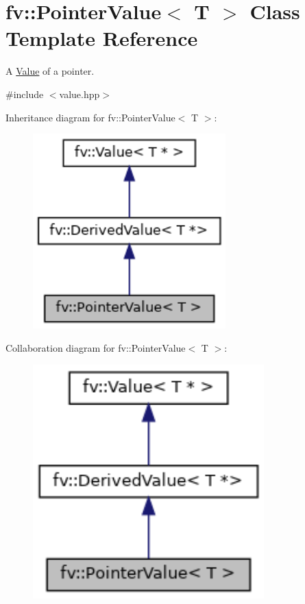 \hypertarget{classfv_1_1PointerValue}{}\section{fv\+:\+:Pointer\+Value$<$ T $>$ Class Template Reference}
\label{classfv_1_1PointerValue}


A \hyperlink{classfv_1_1Value}{Value} of a pointer.  




{\ttfamily \#include $<$value.\+hpp$>$}



Inheritance diagram for fv\+:\+:Pointer\+Value$<$ T $>$\+:
\nopagebreak
\begin{figure}[H]
\begin{center}
\leavevmode
\includegraphics[width=211pt]{classfv_1_1PointerValue__inherit__graph}
\end{center}
\end{figure}


Collaboration diagram for fv\+:\+:Pointer\+Value$<$ T $>$\+:
\nopagebreak
\begin{figure}[H]
\begin{center}
\leavevmode
\includegraphics[width=253pt]{classfv_1_1PointerValue__coll__graph}
\end{center}
\end{figure}

